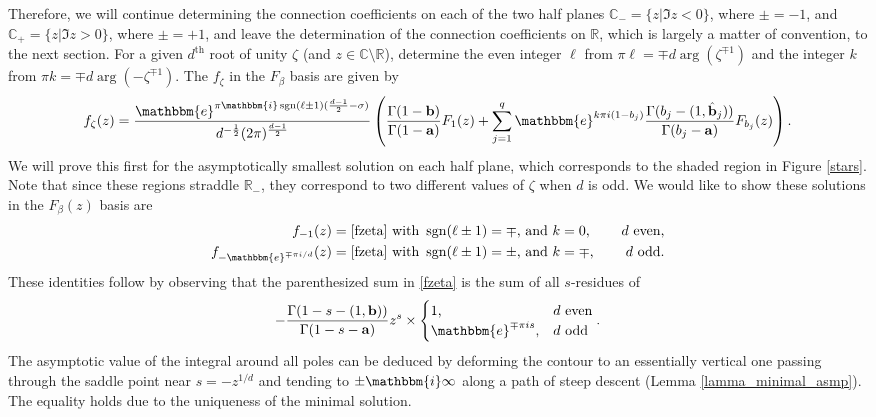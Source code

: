\documentclass[12pt]{article}
\newcommand{\ee}[0] {\mathbbm{e}}
\newcommand{\ii}[0] {\mathbbm{i}}
\numberwithin{equation}{section}
\newcommand{\bfa}[0] {\mathbf{a}}
\newcommand{\bfb}[0] {\mathbf{b}}
\begin{document}
Therefore, we will continue determining the connection coefficients on each of the two half planes $\mathbb{C}_{-} = \{z |\Im z < 0\}$, where $\pm=-1$, and $\mathbb{C}_{+} = \{z |\Im z > 0\}$, where $\pm=+1$,
and leave the determination of the connection coefficients on $\mathbb{R}$, which is largely a matter of convention, to the next section. For a given $d^{\text{th}}$ root of unity $\zeta$ (and $z \in \mathbb{C} \setminus \mathbb{R}$), determine the even integer $\ell$ from $\pi \ell =\mp d \arg(\zeta^{\mp1})$ and the integer $k$ from $\pi k =\mp d \arg(-\zeta^{\mp1})$. The $f_{\zeta}$ in the $F_{\beta}$ basis are given by
\begin{equation}
\label{fzeta}
f_{\zeta}(z) = \frac{\ee^{\pi \ii \operatorname{sgn}(\ell \pm 1) (\frac{d-1}{2}-\sigma)}}{d^{-\frac{1}{2}}(2\pi)^{\frac{d-1}{2}}} \left(\frac{\Gamma(1-\bfb)}{\Gamma(1-\bfa)} F_1(z) + \sum_{j=1}^{q} \ee^{k \pi i (1-b_j)}\frac{\Gamma(b_j - (1,\hat{\bfb}_j))}{\Gamma(b_j-\bfa)} F_{b_j}(z) \right) \text{.}
\end{equation}
We will prove this first for the asymptotically smallest solution on each half plane, which corresponds to the shaded region in Figure \ref{stars}. Note that since these regions straddle $\mathbb{R}_{-}$, they correspond to two different values of $\zeta$ when $d$ is odd. We would like to show these solutions in the $F_{\beta}(z)$ basis are
\begin{align*}
f_{-1}(z) &= \eqref{fzeta} \text{ with } \operatorname{sgn}(\ell \pm 1) = \mp\text{, and } k = 0\text{,} \quad & d \text{ even}\text{,}\\
f_{-\ee^{\mp\pi i/d}}(z) &= \eqref{fzeta} \text{ with } \operatorname{sgn}(\ell \pm 1) = \pm\text{, and } k = \mp \text{,} \quad & d \text{ odd}\text{.}
\end{align*}
These identities follow by observing that the parenthesized sum in \eqref{fzeta} is the sum of all $s$-residues of
\begin{equation*}
-\frac{\Gamma(1-s-(1,\bfb))}{\Gamma(1-s-\bfa)} z^s \times \begin{cases}
1\text{,} & d \text{ even}\\
\ee^{\mp \pi i s}\text{,} & d \text{ odd}
\end{cases}\text{.}
\end{equation*}
The asymptotic value of the integral around all poles can be deduced by deforming the contour to an essentially vertical one passing through the saddle point near $s=-z^{1/d}$ and tending to $\pm \ii \infty$ along a path of steep descent (Lemma \ref{lamma_minimal_asmp}). The equality holds due to the uniqueness of the minimal solution.
\end{document}
